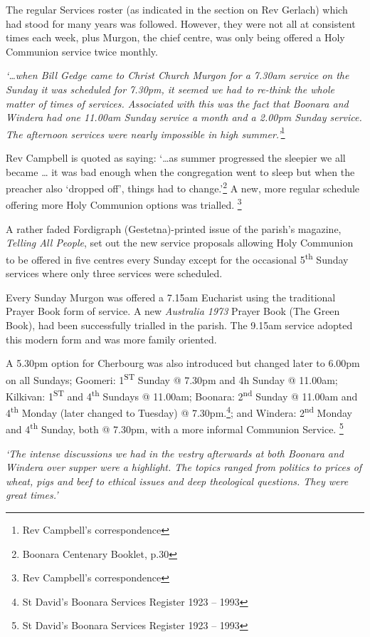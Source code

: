 The regular Services roster (as indicated in the section on Rev Gerlach) which had stood for many years was followed. However, they were not all at consistent times each week, plus Murgon, the chief centre, was only being offered a Holy Communion service twice monthly.

\emph{`\ldots when Bill Gedge came to Christ Church Murgon for a 7.30am service on the Sunday it was scheduled for 7.30pm, it seemed we had to re-think the whole matter of times of services. Associated with this was the fact that Boonara and Windera had one 11.00am Sunday service a month and a 2.00pm Sunday service. The afternoon services were nearly impossible in high summer.'}\footnote{Rev Campbell's correspondence}

Rev Campbell is quoted as saying: `\ldots as summer progressed the sleepier we all became \ldots{} it was bad enough when the congregation went to sleep but when the preacher also `dropped off', things had to change.'\footnote{Boonara Centenary Booklet, p.30} A new, more regular schedule offering more Holy Communion options was trialled. \footnote{Rev Campbell's correspondence}

A rather faded Fordigraph (Gestetna)-printed issue of the parish's magazine, \emph{Telling All People}, set out the new service proposals allowing Holy Communion to be offered in five centres every Sunday except for the occasional 5\textsuperscript{th} Sunday services where only three services were scheduled.

Every Sunday Murgon was offered a 7.15am Eucharist using the traditional Prayer Book form of service. A new \emph{Australia 1973} Prayer Book (The Green Book), had been successfully trialled in the parish. The 9.15am service adopted this modern form and was more family oriented.

A 5.30pm option for Cherbourg was also introduced but changed later to 6.00pm on all Sundays; Goomeri: 1\textsuperscript{ST} Sunday @ 7.30pm and 4h Sunday @ 11.00am; Kilkivan: 1\textsuperscript{ST} and 4\textsuperscript{th} Sundays @ 11.00am; Boonara: 2\textsuperscript{nd} Sunday @ 11.00am and 4\textsuperscript{th} Monday (later changed to Tuesday) @ 7.30pm.\footnote{St David's Boonara Services Register 1923 -- 1993}; and Windera: 2\textsuperscript{nd} Monday and 4\textsuperscript{th} Sunday, both @ 7.30pm, with a more informal Communion Service. \footnote{St David's Boonara Services Register 1923 -- 1993}

\emph{`The intense discussions we had in the vestry afterwards at both Boonara and Windera over supper were a highlight. The topics ranged from politics to prices of wheat, pigs and beef to ethical issues and deep theological questions. They were great times.'}

